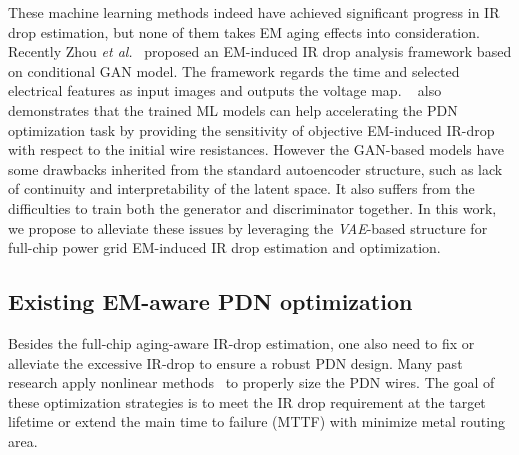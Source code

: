 These machine learning methods indeed have achieved significant progress in IR drop estimation, but none of them takes EM aging effects into consideration. Recently Zhou {\it et al.}~\cite{ZhouJin:ICCAD'20} proposed an EM-induced IR drop analysis framework based on conditional GAN model. The framework regards the time and selected electrical features as input images and outputs the voltage map. ~\cite{ZhouJin:ICCAD'20} also demonstrates that the trained ML models can help accelerating the PDN optimization task by providing the sensitivity of objective EM-induced IR-drop with respect to the initial wire resistances. 
However the GAN-based models have some drawbacks inherited from the standard autoencoder structure, such as lack of continuity and interpretability of the latent space. It also suffers from the difficulties to train both the generator and discriminator together. 
In this work, we propose to alleviate these issues by leveraging the {\it VAE}-based structure for full-chip power grid EM-induced IR drop estimation and optimization.


\subsection{Existing EM-aware PDN optimization}
 \label{subsec:exist_pgfix}
 Besides the full-chip aging-aware IR-drop estimation, one also need to fix or alleviate the excessive IR-drop to ensure a robust PDN design. Many past research apply nonlinear methods~\cite{ChBr:TCAD'88,DuMa:DAC'89,Tan:DAC'99,Wang:TCAD'05,ZhouSun:TVLSI'19, Sukharev:2019pg} to properly size the PDN wires. The goal of these optimization strategies is to meet the IR drop requirement at the target lifetime or extend the main time to failure (MTTF) with minimize metal routing area.

